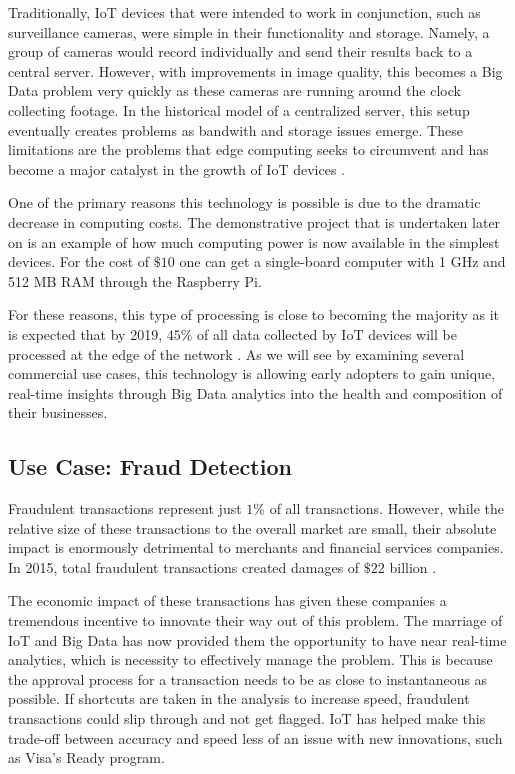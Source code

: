 \documentclass[sigconf]{acmart}
\begin{document}
Traditionally, IoT devices that were intended to work in conjunction, such as surveillance cameras, were simple in their functionality and storage. Namely, a group of cameras would record individually and send their results back to a central server. However, with improvements in image quality, this becomes a Big Data problem very quickly as these cameras are running around the clock collecting footage. In the historical model of a centralized server, this setup eventually creates problems as bandwith and storage issues emerge. These limitations are the problems that edge computing seeks to circumvent and has become a major catalyst in the growth of IoT devices \cite{edge}.   

One of the primary reasons this technology is possible is due to the dramatic decrease in computing costs. The demonstrative project that is undertaken later on is an example of how much computing power is now available in the simplest devices. For the cost of $\$10$ one can get a single-board computer with 1 GHz and 512 MB RAM through the Raspberry Pi.

For these reasons, this type of processing is close to becoming the majority as it is expected that by 2019, $45\%$ of all data collected by IoT devices will be processed at the edge of the network \cite{msft}. As we will see by examining several commercial use cases, this technology is allowing early adopters to gain unique, real-time insights through Big Data analytics into the health and composition of their businesses.

\subsection{Use Case: Fraud Detection}
Fraudulent transactions represent just $1\%$ of all transactions. However, while the relative size of these transactions to the overall market are small, their absolute impact is enormously detrimental to merchants and financial services companies. In 2015, total fraudulent transactions created damages of $\$22$ billion \cite{fraud}.

The economic impact of these transactions has given these companies a tremendous incentive to innovate their way out of this problem. The marriage of IoT and Big Data has now provided them the opportunity to have near real-time analytics, which is  necessity to effectively manage the problem. This is because the approval process for a transaction needs to be as close to instantaneous as possible. If shortcuts are taken in the analysis to increase speed, fraudulent transactions could slip through and not get flagged. IoT has helped make this trade-off between accuracy and speed less of an issue with new innovations, such as Visa's Ready program. 
\end{document}
